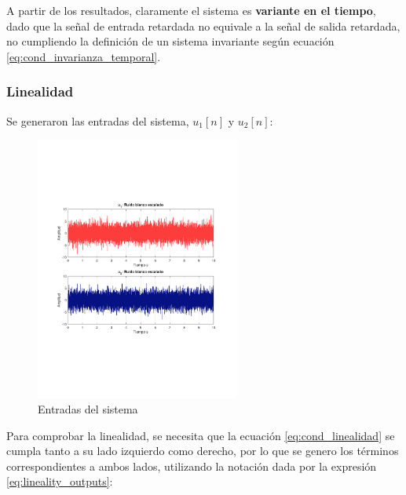 			A partir de los resultados, claramente el sistema es \textbf{variante en el tiempo}, dado que la señal de entrada retardada no equivale a la señal de salida retardada, no cumpliendo la definición de un sistema invariante según ecuación \ref{eq:cond_invarianza_temporal}.

\newpage

		\subsubsection{Linealidad}
			Se generaron las entradas del sistema, $u_{1}[n]$ y $u_{2}[n]$: 
			\begin{figure}[H]
				\center
				\includegraphics[width=0.6\textwidth,clip, trim = {2cm 7.0cm 2.2cm 7.0cm}]{../imgs/sistema_1_linealidad_entradas.pdf}
				\caption{Entradas del sistema}
				\label{fig:s_1_lineality_inputs}
			\end{figure}

			Para comprobar la linealidad, se necesita que la ecuación \ref{eq:cond_linealidad} se cumpla tanto a su lado izquierdo como derecho, por lo que se genero los términos correspondientes a ambos lados, utilizando la notación dada por la expresión \ref{eq:lineality_outputs}:
			
